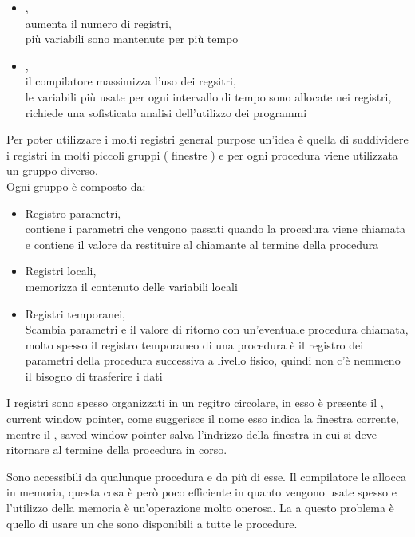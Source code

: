 \documentclass[arch.tex]{subfiles}
\begin{document}
\begin{itemize}
	\item {},\\
		aumenta il numero di registri,\\
		più variabili sono mantenute per più tempo
	\item {},\\
		il compilatore massimizza l'uso dei regsitri,\\
		le variabili più usate per ogni intervallo di tempo sono allocate nei registri,\\
		richiede una sofisticata analisi dell'utilizzo dei programmi
\end{itemize}
Per poter utilizzare i molti registri general purpose un'idea è quella di suddividere i registri
in molti piccoli gruppi ( finestre ) e per ogni procedura viene utilizzata un gruppo diverso.\\
Ogni gruppo è composto da:
\begin{itemize}
	\item Registro parametri,\\
		contiene i parametri che vengono passati quando la procedura viene chiamata
		e contiene il valore da restituire al chiamante al termine della procedura
	\item Registri locali,\\
		memorizza il contenuto delle variabili locali
	\item Registri temporanei,\\
		Scambia parametri e il valore di ritorno con un'eventuale procedura chiamata,\\
		molto spesso il registro temporaneo di una procedura  è il registro
		dei parametri della procedura successiva  a livello fisico, quindi
		non c'è nemmeno il bisogno di trasferire i dati
\end{itemize}

%
\label{par:buffer_circolare}

I registri sono spesso organizzati in un regitro circolare, in esso è presente il , 
current window pointer, come suggerisce il nome esso indica la finestra corrente,\\
mentre il , saved window pointer salva l'indrizzo della finestra in cui si deve 
ritornare al termine della procedura in corso.

%
\label{par:variabili_globali}
Sono accessibili da qualunque procedura e da più di esse. Il compilatore
le allocca in memoria, questa cosa è però poco efficiente in quanto vengono usate spesso 
e l'utilizzo della memoria è un'operazione molto onerosa. La  a questo problema
è quello di usare un  che sono disponibili a tutte le procedure.
\end{document}
